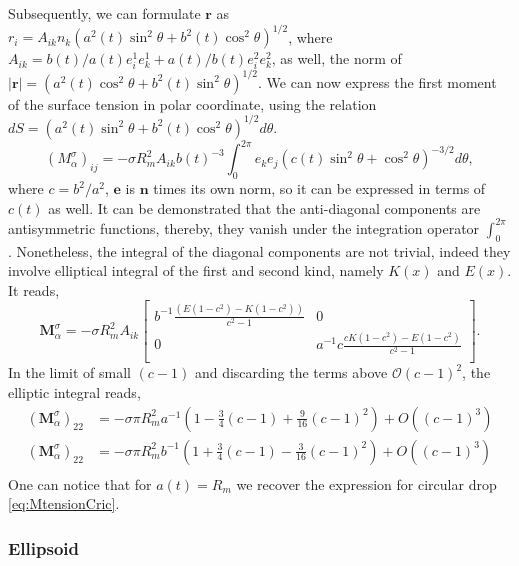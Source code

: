 Subsequently, we can formulate $\bm{r}$ as 
$r_i = A_{ik} n_k (a^2(t)\sin^2\theta+b^2(t)\cos^2\theta)^{1/2}$, 
where $A_{ik} =b(t)/a(t) e^1_ie^1_k+a(t)/b(t)e^2_ie^2_k$,
as well, the norm of $|\bm{r}| = (a^2(t)\cos^2\theta+b^2(t)\sin^2\theta)^{1/2}$.
We can now express the first moment of the surface tension in polar coordinate, using the relation 
$dS = (a^2(t)\sin^2\theta+b^2(t)\cos^2\theta)^{1/2}d\theta$.
\begin{equation*}
    (M_{\alpha}^\sigma)_{ij} 
    = - \sigma R_m^2 A_{ik} b(t)^{-3}\int_{0}^{2\pi}
    e_k  e_j 
    (c(t)\sin^2\theta+\cos^2\theta)^{-3/2} 
    d\theta,
\end{equation*}
where $c = b^2/a^2$, $\bm{e}$ is $\bm{n}$ times its own norm, so it can be expressed in terms of $c(t) $ as well. 
It can be demonstrated that the anti-diagonal components are antisymmetric functions, thereby, they vanish under the integration operator $\int_0^{2\pi}$. 
Nonetheless, the integral of the diagonal components are not trivial, indeed they involve elliptical integral of the first and second kind, namely $K(x)$ and $E(x)$. It reads,
\begin{equation*}
    \bm{M}_{\alpha}^\sigma
    = - \sigma R_m^2 A_{ik} \left[    
        \begin{matrix}
            b^{-1} \frac{(E(1 - c^2) - K(1 - c^2))}{c^2-1} & 0\\
            0 & a^{-1} c\frac{cK(1 - c^2) - E(1 - c^2)}{c^2-1}\\
        \end{matrix}
    \right].
\end{equation*}
In the limit of small $(c-1)$ and discarding the terms above $\mathcal{O}(c-1)^2$, the elliptic integral reads,
\begin{align*}
    (\bm{M}_{\alpha}^\sigma)_{22}
    &= - \sigma \pi R_m^2 
            a^{-1} (1 -\frac{3}{4}   (c-1)+\frac{9}{16}   (c-1)^2 )
    +O\left((c-1)^3\right)\\
    (\bm{M}_{\alpha}^\sigma)_{22}
    &= - \sigma \pi R_m^2 
            b^{-1} (1 +\frac{3}{4}   (c-1)-\frac{3}{16}   (c-1)^2)
    +O\left((c-1)^3\right)\\
    \label{eq:momentSigma}
\end{align*}
One can notice that for $a(t) = R_m$ we recover the expression for circular drop \ref{eq:MtensionCric}.

\subsubsection*{Ellipsoid}

